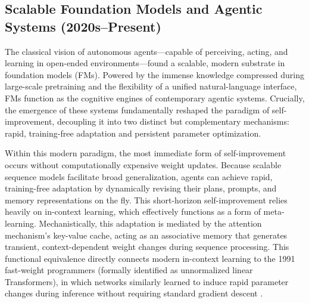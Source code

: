 \subsection{Scalable Foundation Models and Agentic Systems (2020s--Present)}
The classical vision of autonomous agents---capable of perceiving, acting, and learning in open-ended environments---found a scalable, modern substrate in foundation models (FMs). Powered by the immense knowledge compressed during large-scale pretraining and the flexibility of a unified natural-language interface, FMs function as the cognitive engines of contemporary agentic systems. Crucially, the emergence of these systems fundamentally reshaped the paradigm of self-improvement, decoupling it into two distinct but complementary mechanisms: rapid, training-free adaptation and persistent parameter optimization.


Within this modern paradigm, the most immediate form of self-improvement occurs without computationally expensive weight updates. Because scalable sequence models facilitate broad generalization, agents can achieve rapid, training-free adaptation by dynamically revising their plans, prompts, and memory representations on the fly. This short-horizon self-improvement relies heavily on in-context learning, which effectively functions as a form of meta-learning. Mechanistically, this adaptation is mediated by the attention mechanism's key-value cache, acting as an associative memory that generates transient, context-dependent weight changes during sequence processing. This functional equivalence directly connects modern in-context learning to the 1991 fast-weight programmers (formally identified as unnormalized linear Transformers), in which networks similarly learned to induce rapid parameter changes during inference without requiring standard gradient descent \citep{Schmidhuber:91fastweights, schmidhuber1992learning, schmidhuber1993self, schlag2021linear}.


